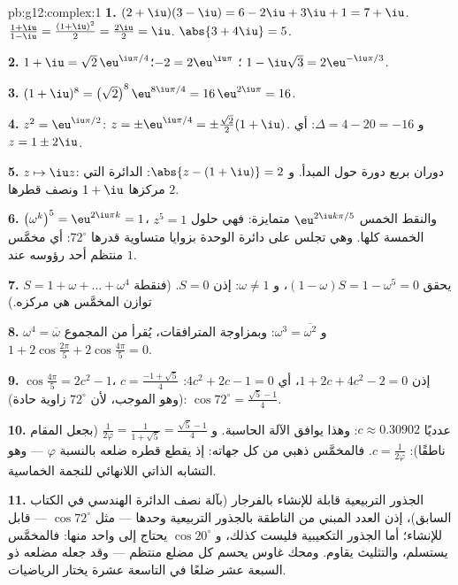 \begin{solution}{pb:g12:complex:1}
\textbf{1.} $(2 + \iu)(3 - \iu) = 6 - 2\iu + 3\iu + 1 =
7 + \iu$. \quad $\frac{1 + \iu}{1 - \iu} =
\frac{(1 + \iu)^2}{2} = \frac{2\iu}{2} = \iu$. \quad
$\abs{3 + 4\iu} = 5$.

\textbf{2.} $1 + \iu = \sqrt2\,\eu^{\iu\pi/4}$؛
$-2 = 2\eu^{\iu\pi}$؛
$1 - \iu\sqrt3 = 2\eu^{-\iu\pi/3}$.

\textbf{3.} $(1 + \iu)^8 = \left(\sqrt2\right)^8
\eu^{8\iu\pi/4} = 16\,\eu^{2\iu\pi} = 16$.

\textbf{4.} $z^2 = \eu^{\iu\pi/2}$:
$z = \pm\eu^{\iu\pi/4} = \pm\frac{\sqrt2}{2}(1 + \iu)$. و
$\Delta = 4 - 20 = -16$: أي $z = 1 \pm 2\iu$.

\textbf{5.} $z \mapsto \iu z$: دوران بربع دورة
حول المبدأ. و $\abs{z - (1 + \iu)} = 2$: الدائرة التي
مركزها $1 + \iu$ ونصف قطرها $2$.

\textbf{6.} $\left(\omega^k\right)^5 = \eu^{2\iu\pi k} = 1$،
والنقط الخمس $\eu^{2\iu k\pi/5}$ متمايزة: فهي حلول
$z^5 = 1$ الخمسة كلها. وهي تجلس على دائرة الوحدة بزوايا
متساوية قدرها $72^\circ$: أي مخمَّس منتظم أحد رؤوسه عند
$1$.

\textbf{7.} $S = 1 + \omega + \dots + \omega^4$ يحقق
$(1 - \omega)S = 1 - \omega^5 = 0$، و $\omega \neq 1$: إذن
$S = 0$. (فنقطة توازن المخمَّس هي مركزه.)

\textbf{8.} $\omega^4 = \overline\omega$ و
$\omega^3 = \overline{\omega^2}$: وبمزاوجة المترافقات، يُقرأ  من المجموع
$1 + 2\cos\frac{2\pi}{5} + 2\cos\frac{4\pi}{5} = 0$.

\textbf{9.} $\cos\frac{4\pi}{5} = 2c^2 - 1$، إذن
$1 + 2c + 4c^2 - 2 = 0$، أي $4c^2 + 2c - 1 = 0$:
$c = \frac{-1 + \sqrt5}{4}$ (وهو  الموجب، لأن
$72^\circ$ زاوية حادة):
$\cos 72^\circ = \frac{\sqrt5 - 1}{4}$.

\textbf{10.} عدديًا $c \approx 0.30902$: وهذا يوافق
الآلة الحاسبة. و $\frac{1}{2\varphi} = \frac{1}{1 + \sqrt5} =
\frac{\sqrt5 - 1}{4}$ (بجعل المقام ناطقًا): $c = \frac{1}{2\varphi}$.
فالمخمَّس ذهبي من كل جهاته: إذ يقطع قطره
ضلعه بالنسبة $\varphi$ --- وهو التشابه الذاتي اللانهائي
للنجمة الخماسية.

\textbf{11.} الجذور التربيعية قابلة للإنشاء بالفرجار (بآلة
نصف الدائرة  الهندسي في الكتاب السابق)، إذن العدد المبني
من الناطقة بالجذور التربيعية وحدها
--- مثل $\cos 72^\circ$ --- قابل للإنشاء؛ أما الجذور التكعيبية فليست
كذلك، و $\cos 20^\circ$ يحتاج إلى واحد منها: فالمخمَّس يستسلم،
والتثليث يقاوم. ومحك غاوس يحسم كل مضلع
منتظم --- وقد جعله مضلعه ذو السبعة عشر ضلعًا في التاسعة عشرة يختار
الرياضيات.


\end{solution}
